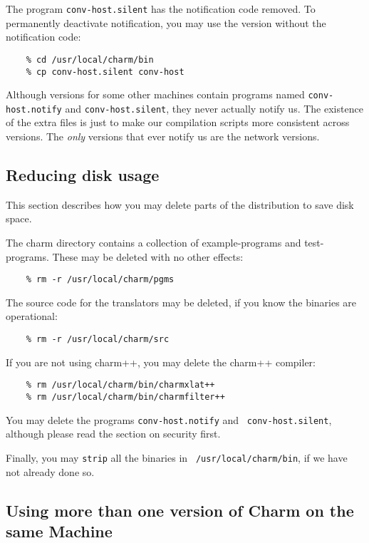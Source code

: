 The program {\tt conv-host.silent} has the notification code removed.  To
permanently deactivate notification, you may use the version without the
notification code:

\begin{verbatim}
    % cd /usr/local/charm/bin
    % cp conv-host.silent conv-host
\end{verbatim}

Although versions for some other machines contain
programs named {\tt conv-host.notify} and {\tt conv-host.silent}, they
never actually notify us.  The existence of the extra files is just to
make our compilation scripts more consistent across versions.  The
{\em only} versions that ever notify us are the network versions.

\subsection{Reducing disk usage}

This section describes how you may delete parts of the distribution to
save disk space.  

The charm directory contains a collection of example-programs and
test-programs.  These may be deleted with no other effects:

\begin{verbatim}
    % rm -r /usr/local/charm/pgms
\end{verbatim}

The source code for the translators may be deleted, if you know the
binaries are operational:

\begin{verbatim}
    % rm -r /usr/local/charm/src
\end{verbatim}

If you are not using charm++, you may delete the charm++ compiler:

\begin{verbatim}
    % rm /usr/local/charm/bin/charmxlat++
    % rm /usr/local/charm/bin/charmfilter++
\end{verbatim}

You may delete the programs {\tt conv-host.notify} and {\tt
conv-host.silent}, although please read the section on security first.

Finally, you may {\tt strip} all the binaries in {\tt
/usr/local/charm/bin}, if we have not already done so.

\subsection{Using more than one version of Charm on the same Machine}

